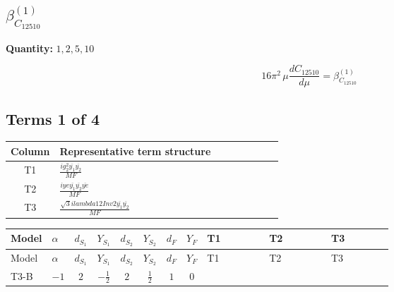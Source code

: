 \documentclass[8pt]{article}
\begin{document}
\begin{landscape}
\section*{$\beta_{C_{12510}}^{(1)}$}
\noindent\textbf{Quantity: }$\mathrm{1,2,5,10}$\par\smallskip
\[16\pi^2\,\mu\frac{d C_{12510}}{d\mu}=\beta_{C_{12510}}^{(1)}\]
\subsection*{Terms 1 of 4}
\begin{center}
\begin{tabular}{@{}c >{\raggedright\arraybackslash}p{0.82\linewidth}@{}}
\toprule
Column & Representative term structure \\
\midrule
T1 & \(\displaystyle \frac{i g_{2}^{2} \overline{y_{1}} \overline{y_{2}}}{MF}\) \\
\midrule
T2 & \(\displaystyle \frac{i ye \overline{y_{1}} \overline{y_{2}} \overline{ye}}{MF}\) \\
\midrule
T3 & \(\displaystyle \frac{\sqrt{3} i lambda12Inv2 \overline{y_{1}} \overline{y_{2}}}{MF}\) \\
\midrule
\bottomrule
\end{tabular}
\end{center}
\smallskip
\tiny
\begin{longtable}{@{}llcccccc >{\raggedright\arraybackslash}p{0.21\linewidth} >{\raggedright\arraybackslash}p{0.21\linewidth} >{\raggedright\arraybackslash}p{0.21\linewidth}@{}}
\toprule
Model & $\alpha$ & $d_{S_1}$ & $Y_{S_1}$ & $d_{S_2}$ & $Y_{S_2}$ & $d_F$ & $Y_F$ & T1 & T2 & T3 \\
\midrule
\endfirsthead
\toprule
Model & $\alpha$ & $d_{S_1}$ & $Y_{S_1}$ & $d_{S_2}$ & $Y_{S_2}$ & $d_F$ & $Y_F$ & T1 & T2 & T3 \\
\midrule
\endhead
T3-B & $-1$ & $2$ & $-\frac{1}{2}$ & $2$ & $\frac{1}{2}$ & $1$ & $0$ & \scriptsize\adjustbox{max width=\linewidth}{$\begin{gathered} \frac{3 i g_{2}^{2} \overline{y_{1}} \overline{y_{2}}}{8 MF}\end{gathered}$} & \scriptsize\adjustbox{max width=\linewidth}{$\begin{gathered} - \frac{i ye \overline{y_{1}} \overline{y_{2}} \overline{ye}}{8 MF}\end{gathered}$} & \scriptsize\adjustbox{max width=\linewidth}{$\begin{gathered} \frac{\sqrt{3} i lambda12Inv2 \overline{y_{1}} \overline{y_{2}}}{6 MF}\end{gathered}$} \\

\end{longtable}
\end{landscape}
\end{document}
